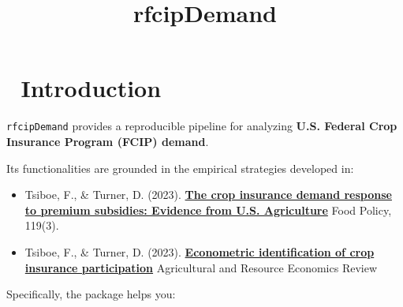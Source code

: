 \documentclass[
]{article}
\title{rfcipDemand}
\author{}
\date{\vspace{-2.5em}}
\makeatletter
\newcommand*\pandocbounded[1]{%
  \sbox\pandoc@box{#1}%
  \Gscale@div\@tempa{\textheight}{\dimexpr\ht\pandoc@box+\dp\pandoc@box\relax}%
  \Gscale@div\@tempb{\linewidth}{\wd\pandoc@box}%
  \ifdim\@tempb\p@<\@tempa\p@\let\@tempa\@tempb\fi%
  \ifdim\@tempa\p@<\p@\scalebox{\@tempa}{\usebox\pandoc@box}%
  \else\usebox{\pandoc@box}%
  \fi%
}
\makeatother
\begin{document}
\maketitle

\href{https://www.repostatus.org/\#active}{\pandocbounded{}}
\href{https://lifecycle.r-lib.org/articles/stages.html\#experimental}{\pandocbounded{}}
\href{https://github.com/ftsiboe/rfcipDemand/actions/workflows/R-CMD-check.yaml}{\pandocbounded{}}
\href{https://codecov.io/gh/ftsiboe/rfcipDemand}{\pandocbounded{\texttt{[image: https://codecov.io/gh/ftsiboe/rfcipDemand/graph/badge.svg?token=6MKGP8Z5NB]}}}
\pandocbounded{\texttt{[image: https://img.shields.io/badge/R-\\\%3E=4.0-blue]}}
\href{code_of_conduct.md}{\pandocbounded{}}
\pandocbounded{}

\section{📖 Introduction}\label{introduction}

\texttt{rfcipDemand} provides a reproducible pipeline for analyzing
\textbf{U.S. Federal Crop Insurance Program (FCIP) demand}.

Its functionalities are grounded in the empirical strategies developed
in:

\begin{itemize}
\item
  Tsiboe, F., \& Turner, D. (2023).
  \href{https://doi.org/10.1016/j.foodpol.2023.102505}{\textbf{The crop
  insurance demand response to premium subsidies: Evidence from U.S.
  Agriculture}} Food Policy, 119(3).
\item
  Tsiboe, F., \& Turner, D. (2023).
  \href{https://doi.org/10.1017/age.2023.13}{\textbf{Econometric
  identification of crop insurance participation}} Agricultural and
  Resource Economics Review
\end{itemize}

Specifically, the package helps you:
\end{document}
